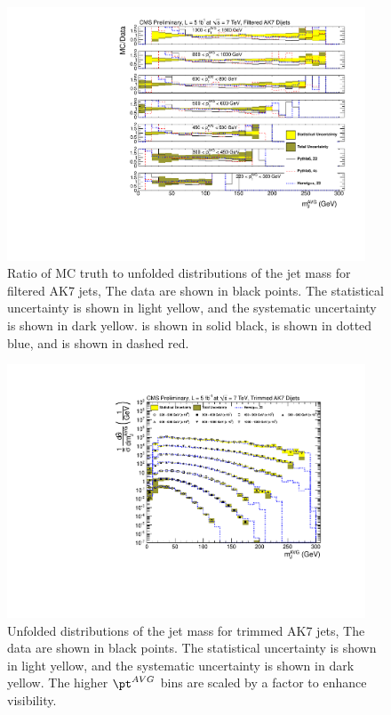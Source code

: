 \begin{figure}[htbp]
\centering
\includegraphics[width=0.95\textwidth]{figs/unfoldedMeasurementDijets_allfrac__Filtered}
\caption{Ratio of MC truth to unfolded distributions of the jet mass for filtered AK7 jets,
The data are shown in black points.
The statistical uncertainty is shown in light yellow, and the
systematic uncertainty is shown in dark yellow. \PYTHIA is shown in solid black, \HERWIG is shown in dotted blue, and  is shown in dashed red.
\label{figs:unfoldedMeasurementDijets_allfrac_Filtered}}
\end{figure}


\begin{figure}[htbp]
\centering
\includegraphics[width=0.95\textwidth]{figs/unfoldedMeasurementDijets_all__Trimmed}
\caption{Unfolded distributions of the jet mass for trimmed AK7 jets,
The data are shown in black points. 
The statistical uncertainty is shown in light yellow, and the
systematic uncertainty is shown in dark yellow.
The higher $\pt^{AVG}$ bins are scaled by a factor to
enhance visibility.
\label{figs:unfoldedMeasurementDijets_all_Trimmed}}
\end{figure}

